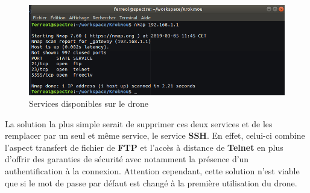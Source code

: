 \begin{figure}[H]
  \centering
  \includegraphics[scale=0.5]{images/scan_drone}
  \caption{Services disponibles sur le drone}
\end{figure}

La solution la plus simple serait de supprimer ces deux services et de les remplacer par un seul et même service, le service \textbf{SSH}. En effet, celui-ci combine l'aspect transfert de fichier de \textbf{FTP} et l'accès à distance de \textbf{Telnet} en plus d'offrir des garanties de sécurité avec notamment la présence d'un authentification à la connexion. Attention cependant, cette solution n'est viable que si le mot de passe par défaut est changé à la première utilisation du drone.
